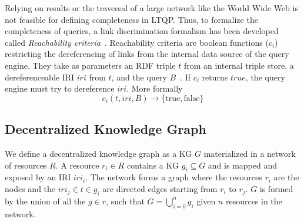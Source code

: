 Relying on results or the traversal of a large network like the World Wide Web is not feasible for defining completeness in LTQP.
Thus, to formalize the completeness of queries, a link discrimination formalism has been developed called \emph{Reachability criteria}~\cite{Hartig2012}.
Reachability criteria are boolean functions ($c_i$) restricting the dereferencing of links from the internal data source of the query engine.
They take as parameters an RDF triple $t$ from an internal triple store, a dereferenceable IRI $iri$ from $t$, and the query $B$~\cite{Hartig2012}.
If $c_i$ returns $true$, the query engine must try to dereference $iri$.
More formally
\begin{equation}\label{eq:reachabilityCriteria}
c_i(t, iri, B) \rightarrow \{\mathrm{true}, \mathrm{false}\}
\end{equation}

\subsection{Decentralized Knowledge Graph}

We define a decentralized knowledge graph as a KG $G$ materialized in a network of resources $R$.
A resource $r_i \in R$ contains a KG $g_i \subseteq G$ and is mapped and exposed by an IRI $iri_i$.
The network forms a graph where the resources $r_i$ are the nodes and the $iri_j \in t \in g_i$ are directed edges starting from $r_i$ to $r_j$.
$G$ is formed by the union of all the $g \in r$, such that $G = \bigcup_{i=0}^{n}g_i$ given $n$ resources in the network.